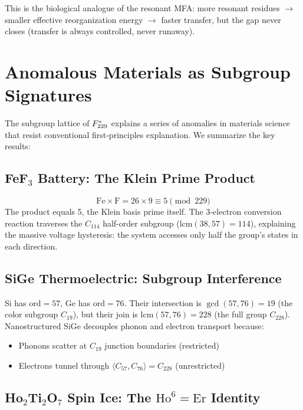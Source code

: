 This is the biological analogue of the resonant MFA: more resonant residues $\to$ smaller effective reorganization energy $\to$ faster transfer, but the gap never closes (transfer is always controlled, never runaway).


\section{Anomalous Materials as Subgroup Signatures}
\label{sec:anomalous}

The subgroup lattice of $F_{229}^*$ explains a series of anomalies in materials science that resist conventional first-principles explanation.  We summarize the key results:

\subsection{FeF$_3$ Battery: The Klein Prime Product}

\[
\mathrm{Fe} \times \mathrm{F} = 26 \times 9 \equiv 5 \pmod{229}
\]
The product equals 5, the Klein basis prime itself.  The 3-electron conversion reaction traverses the $C_{114}$ half-order subgroup ($\mathrm{lcm}(38, 57) = 114$), explaining the massive voltage hysteresis: the system accesses only half the group's states in each direction.

\subsection{SiGe Thermoelectric: Subgroup Interference}

Si has $\mathrm{ord} = 57$, Ge has $\mathrm{ord} = 76$.  Their intersection is $\gcd(57, 76) = 19$ (the color subgroup $C_{19}$), but their join is $\mathrm{lcm}(57, 76) = 228$ (the full group $C_{228}$).  Nanostructured SiGe decouples phonon and electron transport because:
\begin{itemize}
  \item Phonons scatter at $C_{19}$ junction boundaries (restricted)
  \item Electrons tunnel through $\langle C_{57}, C_{76}\rangle = C_{228}$ (unrestricted)
\end{itemize}

\subsection{Ho$_2$Ti$_2$O$_7$ Spin Ice: The $\mathrm{Ho}^6 = \mathrm{Er}$ Identity}

